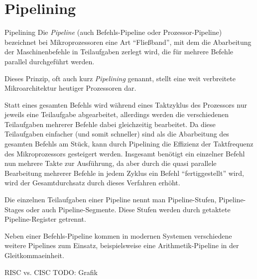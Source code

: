\section{Pipelining}

\begin{defi}{Pipelining}
    Die \emph{Pipeline} (auch Befehls-Pipeline oder Prozessor-Pipeline) bezeichnet bei Mikroprozessoren eine Art \enquote{Fließband}, mit dem die Abarbeitung der Maschinenbefehle in Teilaufgaben zerlegt wird, die für mehrere Befehle parallel durchgeführt werden.

    Dieses Prinzip, oft auch kurz \emph{Pipelining} genannt, stellt eine weit verbreitete Mikroarchitektur heutiger Prozessoren dar.

    Statt eines gesamten Befehls wird während eines Taktzyklus des Prozessors nur jeweils eine Teilaufgabe abgearbeitet, allerdings werden die verschiedenen Teilaufgaben mehrerer Befehle dabei gleichzeitig bearbeitet.
    Da diese Teilaufgaben einfacher (und somit schneller) sind als die Abarbeitung des gesamten Befehls am Stück, kann durch Pipelining die Effizienz der Taktfrequenz des Mikroprozessors gesteigert werden.
    Insgesamt benötigt ein einzelner Befehl nun mehrere Takte zur Ausführung, da aber durch die quasi parallele Bearbeitung mehrerer Befehle in jedem Zyklus ein Befehl \enquote{fertiggestellt} wird, wird der Gesamtdurchsatz durch dieses Verfahren erhöht.

    Die einzelnen Teilaufgaben einer Pipeline nennt man Pipeline-Stufen, Pipeline-Stages oder auch Pipeline-Segmente.
    Diese Stufen werden durch getaktete Pipeline-Register getrennt.

    Neben einer Befehls-Pipeline kommen in modernen Systemen verschiedene weitere Pipelines zum Einsatz, beispielsweise eine Arithmetik-Pipeline in der Gleitkommaeinheit.
\end{defi}

\begin{example}[Pipelining]{RISC vs. CISC}
    TODO: Grafik
\end{example}

